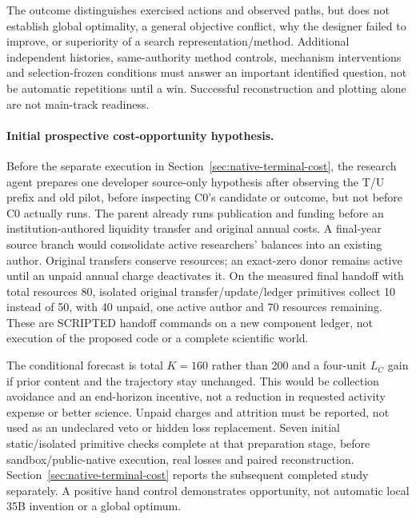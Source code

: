 The outcome distinguishes exercised actions and observed paths, but does not
establish global optimality, a general objective conflict, why the designer
failed to improve, or superiority of a search representation/method. Additional
independent histories, same-authority method controls, mechanism interventions
and selection-frozen conditions must answer an important identified question,
not be automatic repetitions until a win. Successful reconstruction and
plotting alone are not main-track readiness.

\paragraph{Initial prospective cost-opportunity hypothesis.}
Before the separate execution in Section~\ref{sec:native-terminal-cost},
the research agent prepares one developer source-only hypothesis
after observing the T/U prefix and old pilot, before inspecting C0's candidate
or outcome, but not before C0 actually runs. The parent already runs publication
and funding before an institution-authored liquidity transfer and original
annual costs. A final-year source branch would consolidate active researchers'
balances into an existing author. Original transfers conserve resources;
an exact-zero donor remains active until an unpaid annual charge deactivates
it. On the measured final handoff with total resources 80, isolated original
transfer/update/ledger primitives collect 10 instead of 50, with 40 unpaid,
one active author and 70 resources remaining. These are SCRIPTED handoff
commands on a new component ledger, not execution of the proposed code or
a complete scientific world.

The conditional forecast is total $K=160$ rather than 200 and a four-unit
$L_C$ gain if prior content and the trajectory stay unchanged. This would
be collection avoidance and an end-horizon incentive, not a reduction in
requested activity expense or better science. Unpaid charges and attrition
must be reported, not used as an undeclared veto or hidden loss replacement.
Seven initial static/isolated primitive checks complete at that preparation
stage, before sandbox/public-native execution, real losses and paired
reconstruction. Section~\ref{sec:native-terminal-cost} reports the subsequent
completed study separately. A positive hand control demonstrates opportunity,
not automatic local 35B invention or a global optimum.
